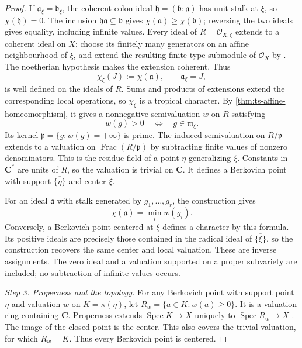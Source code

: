 \begin{proof}
If $\mathfrak a_\xi=\mathfrak b_\xi$, the coherent colon ideal
$\mathfrak h=(\mathfrak b:\mathfrak a)$ has unit stalk at $\xi$,
so $\chi(\mathfrak h)=0$. The inclusion
$\mathfrak h\mathfrak a\subseteq\mathfrak b$ gives
$\chi(\mathfrak a)\geq\chi(\mathfrak b)$; reversing the two ideals
gives equality, including infinite values.
Every ideal of $R=\mathcal O_{X,\xi}$ extends to a coherent ideal
on $X$: choose its finitely many generators on an affine
neighbourhood of $\xi$, and extend the resulting finite type
submodule of $\mathcal O_X$ by \cite[Tag~01PF]{stacks-project}.
The noetherian hypothesis makes the extension coherent.
Thus
\[
             \chi_\xi(J):=\chi(\mathfrak a),
             \qquad \mathfrak a_\xi=J,
\]
is well defined on the ideals of $R$. Sums and products of extensions
extend the corresponding local operations, so $\chi_\xi$ is a
tropical character. By \cref{thm:ts-affine-homeomorphism}, it gives
a nonnegative semivaluation $w$ on $R$ satisfying
\[
                  w(g)>0\quad\Longleftrightarrow\quad
                  g\in\mathfrak m_\xi.
\]
Its kernel $\mathfrak p=\{g:w(g)=+\infty\}$ is prime. The induced
semivaluation on $R/\mathfrak p$ extends to a valuation on
$\operatorname{Frac}(R/\mathfrak p)$ by subtracting finite values
of nonzero denominators. This is the residue field of a point
$\eta$ generalizing $\xi$. Constants in $\mathbf C^*$ are units
of $R$, so the valuation is trivial on $\mathbf C$.
It defines a Berkovich point with support $\overline{\{\eta\}}$
and center $\xi$.

For an ideal $\mathfrak a$ with stalk generated by $g_1,\ldots,g_r$,
the construction gives
\[
                  \chi(\mathfrak a)=\min_i w(g_i).
\]
Conversely, a Berkovich point centered at $\xi$ defines a character
by this formula. Its positive ideals are precisely those contained
in the radical ideal of $\overline{\{\xi\}}$, so the construction
recovers the same center and local valuation. These are inverse
assignments. The zero ideal and a valuation supported on a proper
subvariety are included; no subtraction of infinite values occurs.

\emph{Step 3. Properness and the topology.}
For any Berkovich point with support point $\eta$ and valuation
$w$ on $K=\kappa(\eta)$, let $R_w=\{a\in K:w(a)\geq0\}$.
It is a valuation ring containing
$\mathbf C$. Properness extends $\operatorname{Spec}K\to X$
uniquely to $\operatorname{Spec}R_w\to X$
\cite[Tag~0BX5]{stacks-project}. The image of the closed point
is the center. This also covers the trivial valuation, for which
$R_w=K$. Thus every Berkovich point is centered.


\end{proof}
